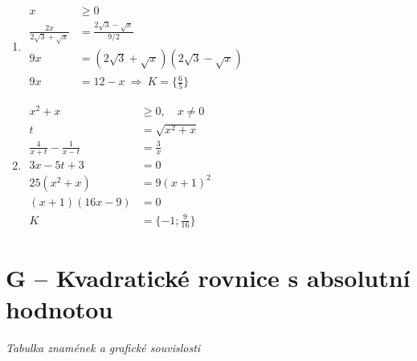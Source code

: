 \documentclass[11pt,a4paper]{article}
\begin{document}
\begin{enumerate}[label={},itemsep=9pt]
\item[\textbf{F009}] \(\displaystyle \begin{aligned}x&\ge0\\\frac{2x}{2\sqrt3+\sqrt x}&=\frac{2\sqrt3-\sqrt x}{9/2}\\9x&=(2\sqrt3+\sqrt x)(2\sqrt3-\sqrt x)\\9x&=12-x\ \Rightarrow\ K=\{\tfrac65\}\end{aligned}\)\par
\item[\textbf{F010}] \(\displaystyle \begin{aligned}x^2+x&\ge0,\quad x\ne0\\t&=\sqrt{x^2+x}\\\frac4{x+t}-\frac1{x-t}&=\frac3x\\3x-5t+3&=0\\25(x^2+x)&=9(x+1)^2\\(x+1)(16x-9)&=0\\K&=\{-1;\tfrac9{16}\}\end{aligned}\)\par
\end{enumerate}
\section*{G -- Kvadratické rovnice s absolutní hodnotou}
\textit{Tabulka znamének a grafické souvislosti}
\end{document}
